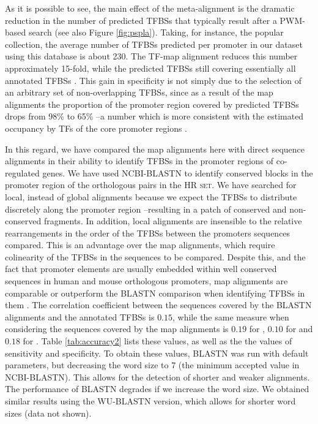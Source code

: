 
  
As it is possible to see, the main effect of the meta-alignment is the
dramatic reduction in the number of predicted TFBSs that typically
result after a PWM-based search (see also Figure \ref{fig:pspla}). Taking, for 
instance, the popular  collection, the average number of TFBSs 
predicted per promoter in our dataset using this database is about 230. 
The TF-map alignment reduces this number approximately 15-fold, while 
the predicted TFBSs still covering essentially all annotated TFBSs \citep{blanco:2006b}. 
This gain in specificity is not simply due to the selection of an 
arbitrary set of non-overlapping TFBSs, since as a result of the map 
alignments the proportion of the promoter region covered by predicted 
TFBSs drops from 98\% to 65\% --a number which is more consistent with 
the estimated occupancy by TFs of the core promoter regions \citep{wray:2003a}. 

In this regard, we have compared the map alignments here with direct
sequence alignments in their ability to identify TFBSs in the promoter
regions of co-regulated genes. We have used NCBI-BLASTN \citep{altschul:1990a} 
to identify conserved blocks in the promoter region of the orthologous pairs in
the \textsc{HR set}. We have searched for local, instead of global
alignments because we expect the TFBSs to distribute discretely along
the promoter region --resulting in a patch of conserved and
non-conserved fragments. In addition, local alignments are insensible
to the relative rearrangements in the order of the TFBSs between the
promoters sequences compared. This is an advantage over the map
alignments, which require colinearity of the TFBSs in the sequences to
be compared. Despite this, and the fact that promoter elements are
usually embedded within well conserved sequences in human and mouse
orthologous promoters, map alignments are comparable or outperform the
BLASTN comparison when identifying TFBSs in them \citep{blanco:2006b}. The correlation
coefficient between the sequences covered by the BLASTN alignments and
the annotated TFBSs is $0.15$, while the same measure when considering
the sequences covered by the map alignments is $0.19$ for ,
$0.10$ for  and $0.18$ for . Table \ref{tab:accuracy2} lists 
these values, as well as the the values of sensitivity and specificity. To obtain
these values, BLASTN was run with default parameters, but decreasing
the word size to 7 (the minimum accepted value in
NCBI-BLASTN). This allows for the detection of shorter and weaker
alignments. The performance of BLASTN degrades if we increase the word
size. We obtained similar results using the
WU-BLASTN version, which allows for shorter word sizes (data not shown).

